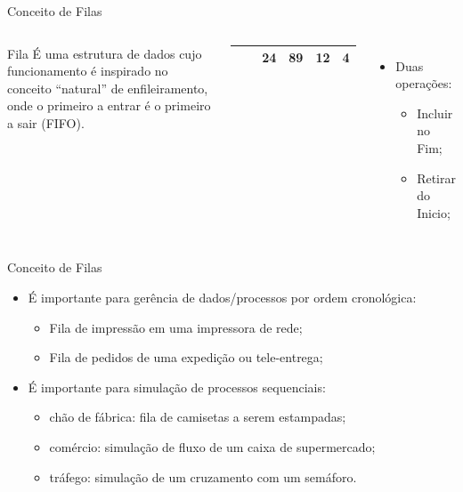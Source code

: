 \documentclass[12pt,table,xcolor={dvipsnames}]{beamer}
\begin{document}
\begin{frame}{Conceito de Filas}
\begin{columns}
\begin{block}{Fila}
É uma estrutura de dados cujo funcionamento é inspirado no conceito “natural” de enfileiramento, onde o primeiro a entrar é o primeiro a sair (FIFO).
\end{block}
\begin{center}
{
\begin{tabular}{ |p{.5cm}|p{.5cm}|p{.5cm}|p{.5cm}|p{.5cm}|p{.5cm}| }
\hline
& & 24 & 89 & 12 & 4  \\ \hline
\end{tabular}
}
\end{center}
\begin{itemize}
\item Duas operações:
\begin{itemize}
\item {\color{red}Incluir no Fim};
\item {\color{red}Retirar do Inicio};
\end{itemize}
\end{itemize}
\end{columns}
\end{frame}

\begin{frame}{Conceito de Filas}
\begin{itemize}
\item É importante para gerência de dados/processos por ordem cronológica:
\begin{itemize}
\item Fila de impressão em uma impressora de rede;
\item Fila de pedidos de uma expedição ou tele-entrega;
\end{itemize}
\item É importante para simulação de processos sequenciais:
\begin{itemize}
\item chão de fábrica: fila de camisetas a serem estampadas;
\item comércio: simulação de fluxo de um caixa de supermercado;
\item tráfego: simulação de um cruzamento com um semáforo.
\end{itemize}
\end{itemize}
\end{frame}
\end{document}

